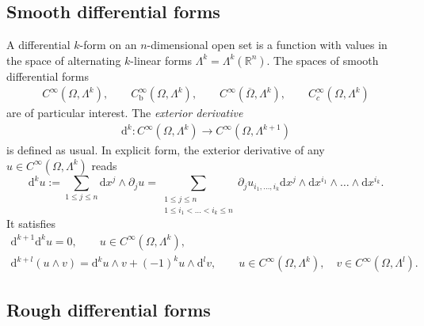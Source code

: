 \documentclass[10pt,a4paper]{amsart}
\theoremstyle{definition}
\theoremstyle{remark}
\numberwithin{equation}{section}
\newcommand{\bbR}{{\mathbb R}}
\newcommand{\closure}{\overline}
\newcommand{\cartan}{{\mathrm d}}
\newcommand{\cartanx}{{\mathrm d}x}
\newcommand{\Domain}{{\Omega}}
\newcommand{\Alt}[1]{\Lambda^{#1}}
\newcommand{\bounded}{\mathrm{b}}
\begin{document}
\subsection{Smooth differential forms}

A differential $k$-form on an $n$-dimensional open set is a function with values in the space of alternating $k$-linear forms $\Alt{k} = \Alt{k}(\bbR^{n})$.
The spaces of smooth differential forms 
\begin{gather*}
    C^{\infty}(\Domain,\Alt{k}),
    \qquad 
    C^{\infty}_{\bounded}(\Domain,\Alt{k}),
    \qquad 
    C^{\infty}(\closure\Domain,\Alt{k}),
    \qquad 
    C^{\infty}_{c}(\Domain,\Alt{k})
\end{gather*}
are of particular interest. The \emph{exterior derivative}
\begin{align}\label{math:exterior-derivative}
	\cartan^{k}: C^{\infty}(\Domain,\Alt{k}) \to C^{\infty}(\Domain,\Alt{k+1})
\end{align}
is defined as usual.
In explicit form, the exterior derivative of any $u \in C^{\infty}(\Domain,\Alt{k})$ reads 
\begin{equation}\label{math:exterior-wedge-formula}
    \cartan^{k} u
    := 
    \sum_{1 \leq j \leq n} \cartanx^{j} \wedge \partial_{j} u 
    =
    \sum_{\substack{ 1 \leq j \leq n \\ 1 \leq i_1 < \dots < i_k \leq n }}
    \partial_j u_{i_1,\dots,i_k} \cartanx^{j} \wedge \cartanx^{i_1} \wedge \dots \wedge \cartanx^{i_k}
    .
\end{equation}
It satisfies 
\begin{gather*}
    \cartan^{k+1} \cartan^{k} u = 0, \qquad u \in C^{\infty}(\Domain,\Alt{k}),
    \\
    \cartan^{k+l} ( u \wedge v ) = \cartan^{k} u \wedge v + (-1)^{k} u \wedge \cartan^{l} v, 
    \qquad 
    u \in C^{\infty}(\Domain,\Alt{k}), \quad v \in C^{\infty}(\Domain,\Alt{l}).
\end{gather*}


\subsection{Rough differential forms}
\end{document}
